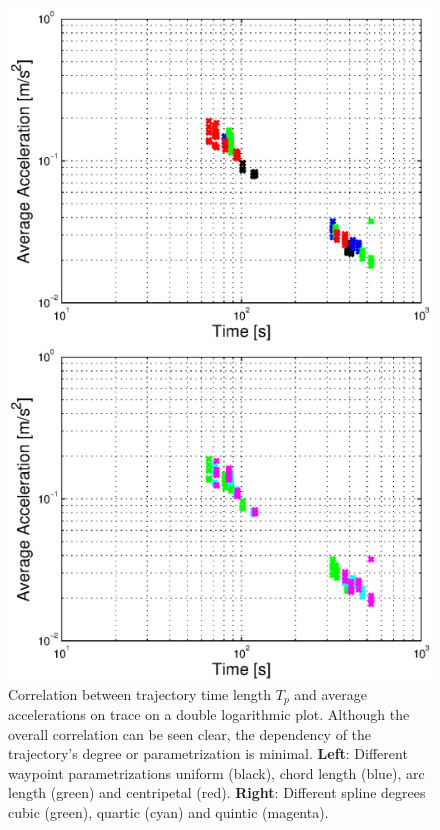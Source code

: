 \begin{figure}[H]
  \begin{minipage}[t]{0.48\textwidth}
    \includegraphics[width = \textwidth]{correlation/Control_Correlation_Time_Acc_Parametrization}
  \end{minipage}
  \hfill
  \begin{minipage}[t]{0.48\textwidth}
    \includegraphics[width = \textwidth]{correlation/Control_Correlation_Time_Acc_SplineDegree}
  \end{minipage}
  \caption{Correlation between trajectory time length $T_p$ and average accelerations on trace on a double logarithmic plot. Although the overall correlation can be seen clear, the dependency of the trajectory's degree or parametrization is minimal. {\bf Left}: Different waypoint parametrizations uniform (black), chord length (blue), arc length (green) and centripetal (red). {\bf Right}: Different spline degrees cubic (green), quartic (cyan) and quintic (magenta).}
  \label{fig:correlation_time_acc}
\end{figure}

